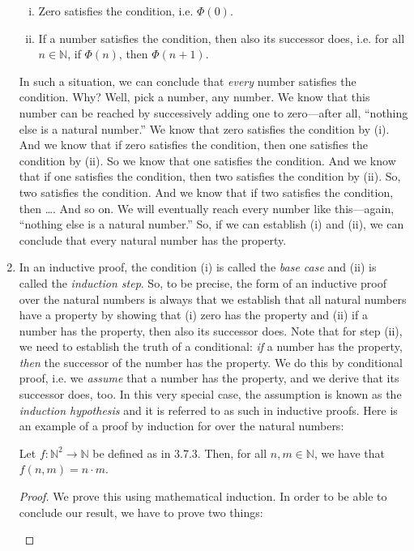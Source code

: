 \begin{enumerate}[{\thesection}.1]
\begin{enumerate}[(i)]
		\item Zero satisfies the condition, i.e. $\Phi(0)$.
		
		\item If a number satisfies the condition, then also its successor does, i.e. for all $n\in\mathbb{N}$, if $\Phi(n)$, then $\Phi(n+1)$. 
	
	\end{enumerate}
In such a situation, we can conclude that \emph{every} number satisfies the condition. Why? Well, pick a number, any number. We know that this number can be reached by successively adding one to zero---after all, ``nothing else is a natural number.'' We know that zero satisfies the condition by (i). And we know that if zero satisfies the condition, then one satisfies the condition by (ii). So we know that one satisfies the condition. And we know that if one satisfies the condition, then two satisfies the condition by (ii). So, two satisfies the condition. And we know that if two satisfies the condition, then \dots. And so on. We will eventually reach every number like this---again, ``nothing else is a natural number.'' So, if we can establish (i) and (ii), we can conclude that every natural number has the property. 

	\item In an inductive proof, the condition (i) is called the \emph{base case} and (ii) is called the \emph{induction step}. So, to be precise, the form of an inductive proof over the natural numbers is always that we establish that all natural numbers have a property by showing that (i) zero has the property and (ii) if a number has the property, then also its successor does. Note that for step (ii), we need to establish the truth of a conditional: \emph{if} a number has the property, \emph{then} the successor of the number has the property. We do this by conditional proof, i.e. we \emph{assume} that a number has the property, and we derive that its successor does, too. In this very special case, the assumption is known as the \emph{induction hypothesis} and it is referred to as such in inductive proofs. Here is an example of a proof by induction for over the natural numbers:
	
	\begin{proposition}
	Let $f:\mathbb{N}^2\to\mathbb{N}$ be defined as in 3.7.3. Then, for all $n,m\in\mathbb{N}$, we have that $f(n,m)=n\cdot m$.
	\end{proposition}
	\begin{proof}
	We prove this using mathematical induction. In order to be able to conclude our result, we have to prove two things:
	\begin{enumerate}[(i)]
	

\end{enumerate}
\end{proof}
\end{enumerate}
